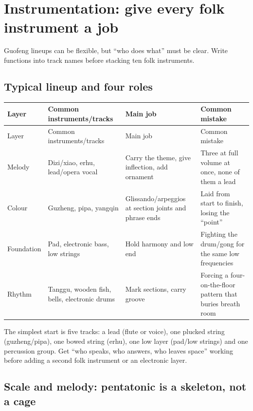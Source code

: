 \section{Instrumentation: give every folk instrument a job}
\label{sec:guofeng-craft}

Guofeng lineups can be flexible, but ``who does what'' must be clear. Write functions into track names before stacking ten folk instruments.

\subsection{Typical lineup and four roles}
\label{sec:guofeng-instrumentation}

\begin{longtable}{p{}p{}p{}p{}}
\toprule
Layer & Common instruments/tracks & Main job & Common mistake \\
\midrule
\endfirsthead
\toprule
Layer & Common instruments/tracks & Main job & Common mistake \\
\midrule
\endhead
Melody & Dizi/xiao, erhu, lead/opera vocal & Carry the theme, give inflection, add ornament & Three at full volume at once, none of them a lead \\
Colour & Guzheng, pipa, yangqin & Glissando/arpeggios at section joints and phrase ends & Laid from start to finish, losing the ``point'' \\
Foundation & Pad, electronic bass, low strings & Hold harmony and low end & Fighting the drum/gong for the same low frequencies \\
Rhythm & Tanggu, wooden fish, bells, electronic drums & Mark sections, carry groove & Forcing a four-on-the-floor pattern that buries breath room \\
\bottomrule
\end{longtable}

The simplest start is five tracks: a lead (flute or voice), one plucked string (guzheng/pipa), one bowed string (erhu), one low layer (pad/low strings) and one percussion group. Get ``who speaks, who answers, who leaves space'' working before adding a second folk instrument or an electronic layer.

\subsection{Scale and melody: pentatonic is a skeleton, not a cage}
\label{sec:guofeng-scale}

